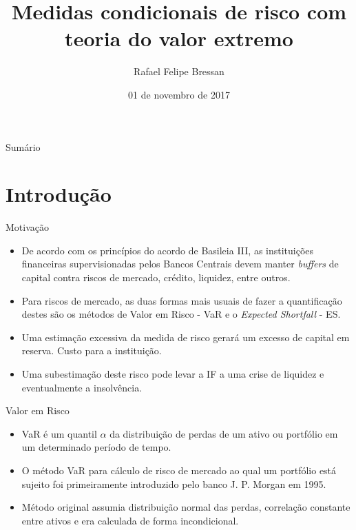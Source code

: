\documentclass[ignorenonframetext,]{beamer}
\title{Medidas condicionais de risco com teoria do valor extremo}
\author{Rafael Felipe Bressan}
\date{01 de novembro de 2017}
\providecommand{\tightlist}{%
  \setlength{\itemsep}{0pt}\setlength{\parskip}{0pt}}
\begin{document}
\frame{\titlepage}

\section[]{}
\begin{frame}{Sumário}
  \tableofcontents
\end{frame}

\section{Introdução}\label{introducao}

\begin{frame}{Motivação}

\begin{itemize}
\tightlist
\item
  De acordo com os princípios do acordo de Basileia III, as instituições
  financeiras supervisionadas pelos Bancos Centrais devem manter
  \emph{buffers} de capital contra riscos de mercado, crédito, liquidez,
  entre outros.
\item
  Para riscos de mercado, as duas formas mais usuais de fazer a
  quantificação destes são os métodos de Valor em Risco - VaR e o
  \emph{Expected Shortfall} - ES.
\item
  Uma estimação excessiva da medida de risco gerará um excesso de
  capital em reserva. Custo para a instituição.
\item
  Uma subestimação deste risco pode levar a IF a uma crise de liquidez e
  eventualmente a insolvência.
\end{itemize}

\end{frame}

\begin{frame}{Valor em Risco}

\begin{itemize}
\tightlist
\item
  VaR é um quantil \(\alpha\) da distribuição de perdas de um ativo ou
  portfólio em um determinado período de tempo.
\item
  O método VaR para cálculo de risco de mercado ao qual um portfólio
  está sujeito foi primeiramente introduzido pelo banco J. P. Morgan em
  1995.
\item
  Método original assumia distribuição normal das perdas, correlação
  constante entre ativos e era calculada de forma incondicional.
\end{itemize}

\end{frame}
\end{document}
